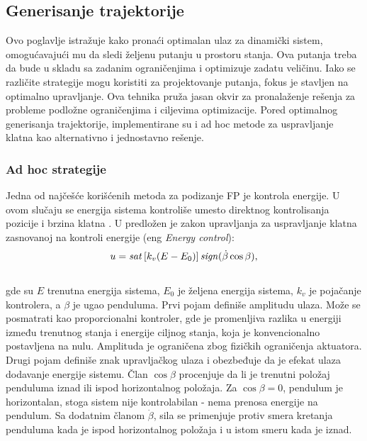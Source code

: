 \documentclass[a4paper,11pt]{article}
\theoremstyle{definition} \newtheorem{deff}{Definicija}[section]
\theoremstyle{definition} \newtheorem{prim}[deff]{Primer}
\theoremstyle{plain} \newtheorem{teor}[deff]{Teorema}
\begin{document}
	\subsection{Generisanje trajektorije}
	
	Ovo poglavlje istražuje kako pronaći optimalan ulaz za dinamički sistem, omogućavajući mu da sledi željenu putanju u prostoru stanja. Ova putanja treba da bude u skladu sa zadanim ograničenjima i optimizuje zadatu veličinu. Iako se različite strategije mogu koristiti za projektovanje putanja, fokus je stavljen na optimalno upravljanje. Ova tehnika pruža jasan okvir za pronalaženje rešenja za probleme podložne ograničenjima i ciljevima optimizacije. Pored optimalnog generisanja trajektorije, implementirane su i ad hoc metode za uspravljanje klatna kao alternativno i jednostavno rešenje. 
	
	\subsubsection{Ad hoc strategije}
	\label{sec:andhoc}
	
	Jedna od najčešće korišćenih metoda za podizanje FP je kontrola energije. U ovom slučaju se energija sistema kontroliše umesto direktnog kontrolisanja pozicije i brzina klatna \cite{inicijalna}.
	U \cite{energy_c} predložen je zakon upravljanja za uspravljanje klatna zasnovanoj na kontroli energije (eng \textit{Energy control}): \\
	
	\begin{equation}
		u = \text{\textit{sat}}\left[k_v (E - E_0)\right] \text{\textit{sign}}( \dot{\beta} \cos \beta), 
		\label{eq:en_control}
	\end{equation} \\
	
	
	gde su $\textit{E}$ trenutna energija sistema, 
	$\textit{E}_0$ je željena energija sistema, $\textit{k}_v$ je pojačanje kontrolera, a $\beta$ je ugao penduluma. Prvi pojam definiše amplitudu ulaza. Može se posmatrati kao proporcionalni kontroler, gde je promenljiva razlika u energiji između trenutnog stanja i energije ciljnog stanja, koja je konvencionalno postavljena na nulu. Amplituda je ograničena zbog fizičkih ograničenja aktuatora. Drugi pojam definiše znak upravljačkog ulaza i obezbeđuje da je efekat ulaza dodavanje energije sistemu. Član $\cos \beta$ procenjuje da li je trenutni položaj penduluma iznad ili ispod horizontalnog položaja. Za $\cos \beta = 0$, pendulum je horizontalan, stoga sistem nije kontrolabilan - nema prenosa energije na pendulum. Sa dodatnim članom $\dot{\beta}$, sila se primenjuje protiv smera kretanja penduluma kada je ispod horizontalnog položaja i u istom smeru kada je iznad.\\
	
\end{document}
